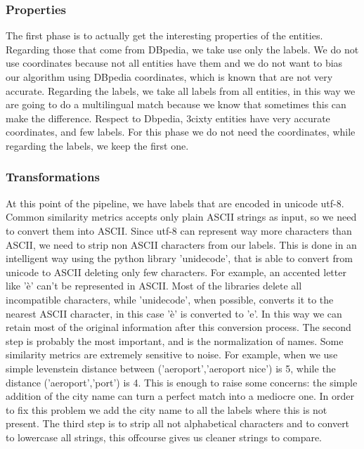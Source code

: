 \subsubsection{Properties}
The first phase is to actually get the interesting properties of the entities. Regarding those that come from DBpedia, we take use only the labels. We do not use coordinates because not all entities have them and we do not want to bias our algorithm using DBpedia coordinates, which is known that are not very accurate. Regarding the labels, we take all labels from all entities, in this way we are going to do a multilingual match because we know that sometimes this can make the difference.
Respect to Dbpedia, 3cixty entities have very accurate coordinates, and few labels. For this phase we do not need the coordinates, while regarding the labels, we keep the first one.
\subsubsection{Transformations}
At this point of the pipeline, we have labels that are encoded in unicode utf-8. Common similarity metrics accepts only plain ASCII strings as input, so we need to convert them into ASCII. Since utf-8 can represent way more characters than ASCII, we need to strip non ASCII characters from our labels. This is done in an intelligent way using the python library 'unidecode', that is able to convert from unicode to ASCII deleting only few characters. For example, an accented letter like 'è' can't be represented in ASCII. Most of the libraries delete all incompatible characters, while 'unidecode', when possible, converts it to the nearest ASCII character, in this case 'è' is converted to 'e'. In this way we can retain most of the original information after this conversion process.
The second step is probably the most important, and is the normalization of names. Some similarity metrics are extremely sensitive to noise. For example, when we use simple levenstein distance between ('aeroport','aeroport nice') is 5, while the distance ('aeroport','port') is 4. This is enough to raise some concerns: the simple addition of the city name can turn a perfect match into a mediocre one. In order to fix this problem we add the city name to all the labels where this is not present.
The third step is to strip all not alphabetical characters and to convert to lowercase all strings, this offcourse gives us cleaner strings to compare.

